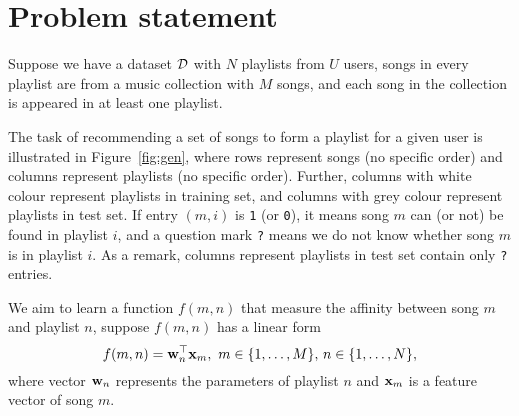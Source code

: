 \section{Problem statement}
\label{sec:problem}


Suppose we have a dataset $\mathcal{D}$ with $N$ playlists from $U$ users, songs in every playlist are from a music collection
with $M$ songs, and each song in the collection is appeared in at least one playlist.

The task of recommending a set of songs to form a playlist for a given user is illustrated in Figure~\ref{fig:gen},
where rows represent songs (no specific order) and columns represent playlists (no specific order).
Further, columns with white colour represent playlists in training set,
and columns with grey colour represent playlists in test set.
If entry $(m, i)$ is \texttt{1} (or \texttt{0}),
it means song $m$ can (or not) be found in playlist $i$,
and a question mark \texttt{?} means we do not know whether song $m$ is in playlist $i$.
As a remark, columns represent playlists in test set contain only \texttt{?} entries.







We aim to learn a function $f(m, n)$ that measure the affinity between song $m$ and playlist $n$,
suppose $f(m, n)$ has a linear form
$$
f(m, n) = \mathbf{w}_n^\top \mathbf{x}_m, \ m \in \{1,\dots,M\}, \, n \in \{1,\dots,N\},
$$
where vector $\mathbf{w}_n$ represents the parameters of playlist $n$ and $\mathbf{x}_m$ is a feature vector of song $m$.


